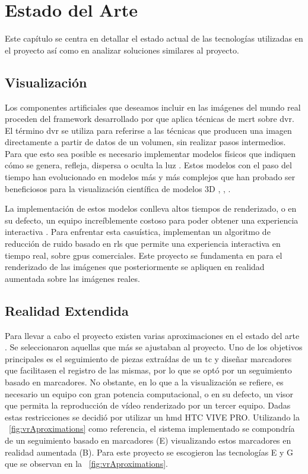 \chapter{Estado del Arte}
\label{chap:ea}
Este capítulo se centra en detallar el estado actual de las tecnologías utilizadas en el proyecto así como en analizar soluciones similares al proyecto.
\section{Visualización}
Los componentes artificiales que deseamos incluir en las imágenes del mundo real proceden del framework desarrollado por \citeauthor{Kroes2012} que aplica técnicas de \acrfull{mcrt} sobre \acrfull{dvr}.
El término \acrshort{dvr} se utiliza para referirse a las técnicas que producen una imagen directamente a partir de datos de un volumen, sin realizar pasos intermedios. Para que esto sea posible es necesario implementar modelos físicos que indiquen cómo se genera, refleja, dispersa o oculta la luz \cite{Max1995}. Estos modelos con el paso del tiempo han evolucionado en modelos más y más complejos que han probado ser beneficiosos para la visualización científica de modelos 3D \cite{Daz2015}, \cite{Englund2016}, \cite{Lindemann2011}.

La implementación de estos modelos conlleva altos tiempos de renderizado, o en su defecto, un equipo increíblemente costoso para poder obtener una experiencia interactiva \cite{IglesiasGuitian2022}. Para enfrentar esta casuística, \citeauthor{IglesiasGuitian2022} implementan un algoritmo de reducción de ruido basado en \acrfull{rls} que permite una experiencia interactiva en tiempo real, sobre \acrshort{gpu}s comerciales. Este proyecto se fundamenta en \cite{IglesiasGuitian2022} para el renderizado de las imágenes que posteriormente se apliquen en realidad aumentada sobre las imágenes reales.

\section{Realidad Extendida}

Para llevar a cabo el proyecto existen varias aproximaciones en el estado del arte \cite{Venkatesan2021}. Se seleccionaron aquellas que más se ajustaban al proyecto.
Uno de los objetivos principales es el seguimiento de piezas extraídas de un \acrshort{tc} y diseñar marcadores que facilitasen el registro de las mismas, por lo que se optó por un seguimiento basado en marcadores. No obstante, en lo que a la visualización se refiere, es necesario un equipo con gran potencia computacional, o en su defecto, un visor que permita la reproducción de vídeo renderizado por un tercer equipo. Dadas estas restricciones se decidió por utilizar un \acrfull{hmd} HTC VIVE PRO. Utilizando la \figurename~\ref{fig:vrAproximations} \cite{Venkatesan2021} como referencia, el sistema implementado se compondría de un seguimiento basado en marcadores (E) visualizando estos marcadores en realidad aumentada (B).
Para este proyecto se escogieron las tecnologías E y G que se observan en la \figurename~\ref{fig:vrAproximations}.

